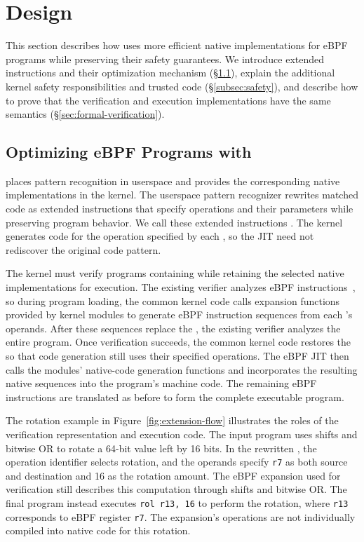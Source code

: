 \section{\tool Design}
\label{sec:mechanism}

This section describes how \tool uses more efficient native implementations for eBPF programs while preserving their safety guarantees. We introduce extended instructions and their optimization mechanism (\S\ref{subsec:pipeline}), explain the additional kernel safety responsibilities and trusted code (\S\ref{subsec:safety}), and describe how to prove that the verification and execution implementations have the same semantics (\S\ref{sec:formal-verification}).

\subsection{Optimizing eBPF Programs with \kinsns}
\label{subsec:pipeline}

\tool places pattern recognition in userspace and provides the corresponding native implementations in the kernel. The userspace pattern recognizer rewrites matched code as extended instructions that specify operations and their parameters while preserving program behavior. We call these extended instructions \kinsns. The kernel generates code for the operation specified by each \kinsn, so the JIT need not rediscover the original code pattern.



The kernel must verify programs containing \kinsns while retaining the selected native implementations for execution. The existing verifier analyzes eBPF instructions~\cite{verifier}, so during program loading, the common kernel code calls expansion functions provided by kernel modules to generate eBPF instruction sequences from each \kinsn's operands. After these sequences replace the \kinsns, the existing verifier analyzes the entire program. Once verification succeeds, the common kernel code restores the \kinsns so that code generation still uses their specified operations. The eBPF JIT then calls the modules' native-code generation functions and incorporates the resulting native sequences into the program's machine code. The remaining eBPF instructions are translated as before to form the complete executable program.

The rotation example in Figure~\ref{fig:extension-flow} illustrates the roles of the verification representation and execution code. The input program uses shifts and bitwise OR to rotate a 64-bit value left by 16 bits. In the rewritten \kinsn, the operation identifier selects rotation, and the operands specify \texttt{r7} as both source and destination and 16 as the rotation amount. The eBPF expansion used for verification still describes this computation through shifts and bitwise OR. The final program instead executes \texttt{rol r13, 16} to perform the rotation, where \texttt{r13} corresponds to eBPF register \texttt{r7}. The expansion's operations are not individually compiled into native code for this rotation.

